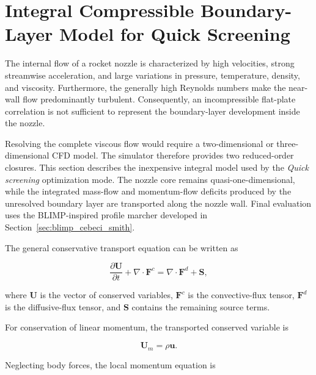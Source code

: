 \section{Integral Compressible Boundary-Layer Model for Quick Screening}
\label{sec:integral_boundary_layer}

The internal flow of a rocket nozzle is characterized by high velocities,
strong streamwise acceleration, and large variations in pressure, temperature,
density, and viscosity. Furthermore, the generally high Reynolds numbers make
the near-wall flow predominantly turbulent. Consequently, an incompressible
flat-plate correlation is not sufficient to represent the boundary-layer
development inside the nozzle.

Resolving the complete viscous flow would require a two-dimensional or
three-dimensional CFD model. The simulator therefore provides two reduced-order
closures. This section describes the inexpensive integral model used by the
\emph{Quick screening} optimization mode. The nozzle core remains
quasi-one-dimensional, while the integrated mass-flow and momentum-flow
deficits produced by the unresolved boundary layer are transported along the
nozzle wall. Final evaluation uses the BLIMP-inspired profile marcher developed
in Section~\ref{sec:blimp_cebeci_smith}.

The general conservative transport equation can be written as

\begin{equation}
    \frac{\partial\boldsymbol{U}}{\partial t}
    +
    \nabla\cdot\boldsymbol{F}^{c}
    =
    \nabla\cdot\boldsymbol{F}^{d}
    +
    \boldsymbol{S},
    \label{eq:general_transport_BL}
\end{equation}

where \(\boldsymbol{U}\) is the vector of conserved variables,
\(\boldsymbol{F}^{c}\) is the convective-flux tensor,
\(\boldsymbol{F}^{d}\) is the diffusive-flux tensor, and
\(\boldsymbol{S}\) contains the remaining source terms.

For conservation of linear momentum, the transported conserved variable is

\begin{equation}
    \boldsymbol{U}_m=\rho\boldsymbol{u}.
\end{equation}

Neglecting body forces, the local momentum equation is

